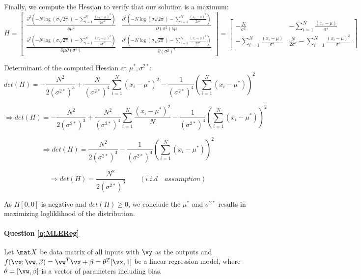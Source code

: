     Finally, we compute the Hessian to verify that our solution is a maximum:
    $$H = \begin{bmatrix}
            \frac{\partial^2 (-N \log (\sigma \sqrt{2\pi}) - \sum_{i=1}^N \frac{(x_i - \mu)^2}{2\sigma'^2})}{\partial \mu^2} & 
            \frac{\partial^2 (-N \log (\sigma \sqrt{2\pi}) - \sum_{i=1}^N \frac{(x_i - \mu)^2}{2\sigma^2})}{\partial (\sigma^2) \partial \mu} \\ 
            \frac{\partial^2 (-N \log (\sigma \sqrt{2\pi}) - \sum_{i=1}^N \frac{(x_i - \mu)^2}{2\sigma'^2})}{\partial \mu \partial (\sigma^2)} & 
            \frac{\partial^2 (-N \log (\sigma \sqrt{2\pi}) - \sum_{i=1}^N \frac{(x_i - \mu)^2}{2\sigma^2})}{\partial (\sigma^2)^2} 
        \end{bmatrix} = 
        \begin{bmatrix} 
            -\frac{N}{\sigma^2} &  
            - \sum_{i=1}^N \frac{(x_i - \mu)}{\sigma^4} \\ 
            - \sum_{i=1}^N \frac{(x_i - \mu) }{\sigma^4} & 
            \frac{N}{2 \sigma^4} - \sum_{i=1}^N \frac{(x_i - \mu)^2}{\sigma^6} 
        \end{bmatrix}$$
    
    Determinant of the computed Hessian at $\mu^*, \sigma^{2*}$:
    $$ det(H) = -\frac{N^2}{2 (\sigma^{2*})^3} + \frac{N}{(\sigma^{2*})^4} \sum_{i=1}^N (x_i - \mu^*)^2 - \frac{1}{(\sigma^{2*})^4} (\sum_{i=1}^N(x_i - \mu^*))^2$$

    $$ \Rightarrow det(H) = -\frac{N^2}{2 (\sigma^{2*})^3} + \frac{N^2}{(\sigma^{2*})^4} \sum_{i=1}^N \frac{(x_i - \mu^{*})^2}{N} - \frac{1}{(\sigma^{2*})^4} (\sum_{i=1}^N(x_i - \mu^{*}))^2$$

    $$ \Rightarrow det(H) = \frac{N^2}{2 (\sigma^{2*})^3}  - \frac{1}{(\sigma^{2*})^4} (\sum_{i=1}^N(x_i - \mu^{*}))^2$$

    $$ \Rightarrow det(H) = \frac{N^2}{2 (\sigma^{2*})^3} \quad \quad (i.i.d \quad assumption)$$


    As $H[0,0]$ is negative and $det(H) \geq 0$, we conclude the $\mu^*$ and $\sigma^{2*}$ results in maximizing logliklihood of the distribution.

    
    

\paragraph{Question \ref{q:MLEReg}}

Let $\mat X$ be data matrix of all inputs with $\vy$ as the outputs and $f(\vx; \vw, \beta) = \vw^T\vx + \beta = \theta^T[\vx, 1]$ be a linear regression model, where $\theta=[\vw, \beta]$ is a vector of parameters including bias.

